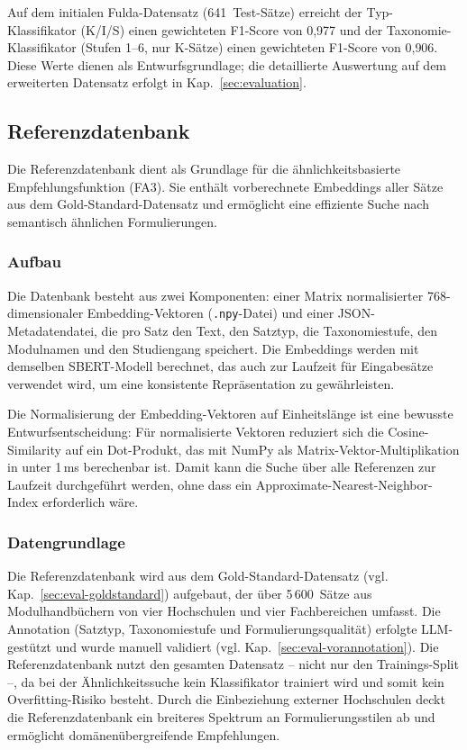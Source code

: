 Auf dem initialen Fulda-Datensatz (641~Test-Sätze) erreicht der Typ-Klassifikator (K/I/S) einen gewichteten F1-Score von 0{,}977 und der Taxonomie-Klassifikator (Stufen 1--6, nur K-Sätze) einen gewichteten F1-Score von 0{,}906.
Diese Werte dienen als Entwurfsgrundlage; die detaillierte Auswertung auf dem erweiterten Datensatz erfolgt in Kap.~\ref{sec:evaluation}.

\subsection{Referenzdatenbank}\label{sec:referenz-db}

Die Referenzdatenbank dient als Grundlage für die ähnlichkeitsbasierte Empfehlungsfunktion (FA3).
Sie enthält vorberechnete Embeddings aller Sätze aus dem Gold-Standard-Datensatz und ermöglicht eine effiziente Suche nach semantisch ähnlichen Formulierungen.

\subsubsection{Aufbau}

Die Datenbank besteht aus zwei Komponenten: einer Matrix normalisierter 768-dimensionaler Embedding-Vektoren (\texttt{.npy}-Datei) und einer JSON-Metadatendatei, die pro Satz den Text, den Satztyp, die Taxonomiestufe, den Modulnamen und den Studiengang speichert.
Die Embeddings werden mit demselben SBERT-Modell berechnet, das auch zur Laufzeit für Eingabesätze verwendet wird, um eine konsistente Repräsentation zu gewährleisten.

Die Normalisierung der Embedding-Vektoren auf Einheitslänge ist eine bewusste Entwurfsentscheidung: Für normalisierte Vektoren reduziert sich die Cosine-Similarity auf ein Dot-Produkt, das mit NumPy als Matrix-Vektor-Multiplikation in unter 1\,ms berechenbar ist.
Damit kann die Suche über alle Referenzen zur Laufzeit durchgeführt werden, ohne dass ein Approximate-Nearest-Neighbor-Index erforderlich wäre.

\subsubsection{Datengrundlage}

Die Referenzdatenbank wird aus dem Gold-Standard-Datensatz (vgl. Kap.~\ref{sec:eval-goldstandard}) aufgebaut, der über 5\,600~Sätze aus Modulhandbüchern von vier Hochschulen und vier Fachbereichen umfasst.
Die Annotation (Satztyp, Taxonomiestufe und Formulierungsqualität) erfolgte LLM-gestützt und wurde manuell validiert (vgl. Kap.~\ref{sec:eval-vorannotation}).
Die Referenzdatenbank nutzt den gesamten Datensatz -- nicht nur den Trainings-Split --, da bei der Ähnlichkeitssuche kein Klassifikator trainiert wird und somit kein Overfitting-Risiko besteht.
Durch die Einbeziehung externer Hochschulen deckt die Referenzdatenbank ein breiteres Spektrum an Formulierungsstilen ab und ermöglicht domänenübergreifende Empfehlungen.

